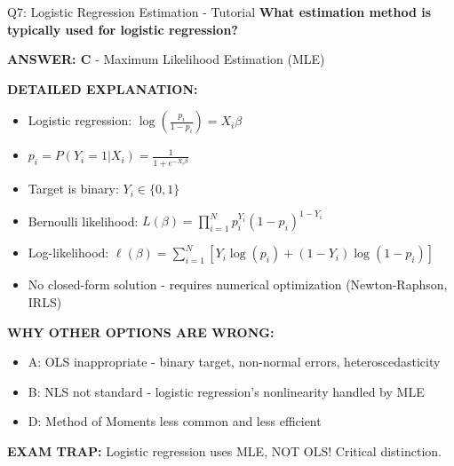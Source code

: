 \documentclass[8pt]{beamer}
\begin{document}
	\begin{frame}{Q7: Logistic Regression Estimation - Tutorial}
		\fontsize{6.5}{7.5}\selectfont
		\textbf{What estimation method is typically used for logistic regression?}
		
		\vspace{0.05cm}
		\textcolor{myblue}{\textbf{ANSWER: C}} - Maximum Likelihood Estimation (MLE)
		
		\vspace{0.05cm}
		\textbf{DETAILED EXPLANATION:}
		\begin{itemize}
			\item Logistic regression: $\log\left(\frac{p_i}{1-p_i}\right) = X_i\beta$
			\item $p_i = P(Y_i = 1 | X_i) = \frac{1}{1 + e^{-X_i\beta}}$
			\item Target is binary: $Y_i \in \{0, 1\}$
			\item Bernoulli likelihood: $L(\beta) = \prod_{i=1}^N p_i^{Y_i}(1-p_i)^{1-Y_i}$
			\item Log-likelihood: $\ell(\beta) = \sum_{i=1}^N [Y_i\log(p_i) + (1-Y_i)\log(1-p_i)]$
			\item No closed-form solution - requires numerical optimization (Newton-Raphson, IRLS)
		\end{itemize}
		
		\vspace{0.05cm}
		\textcolor{myred}{\textbf{WHY OTHER OPTIONS ARE WRONG:}}
		\begin{itemize}
			\item \textcolor{myred}{A:} OLS inappropriate - binary target, non-normal errors, heteroscedasticity
			\item \textcolor{myred}{B:} NLS not standard - logistic regression's nonlinearity handled by MLE
			\item \textcolor{myred}{D:} Method of Moments less common and less efficient
		\end{itemize}
		
		\textcolor{myred}{\textbf{EXAM TRAP:}} Logistic regression uses \textcolor{myblue}{MLE}, NOT OLS! Critical distinction.
	\end{frame}
	
\end{document}
